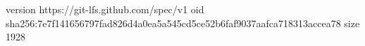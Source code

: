 version https://git-lfs.github.com/spec/v1
oid sha256:7e7f141656797fad826d4a0ea5a545cd5ce52b6faf9037aafca718313accea78
size 1928
